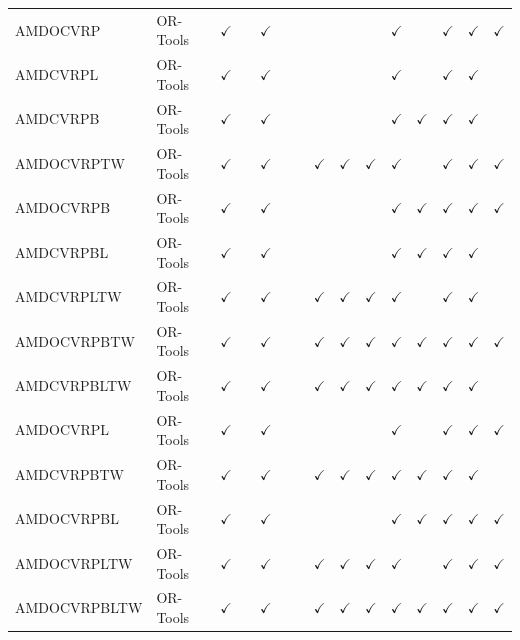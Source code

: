 \documentclass{article}
\theoremstyle{plain}
\theoremstyle{definition}
\theoremstyle{remark}
\begin{document}
\begin{table}[h!]
{\begin{tabular}{l|l|cc|cccccc|ccccc}
    AMDOCVRP&OR-Tools      & $\checkmark$ & & $\checkmark$ & & & & & & $\checkmark$ & & $\checkmark$ & $\checkmark$ & $\checkmark$ \\
    AMDCVRPL&OR-Tools      & $\checkmark$ & & $\checkmark$ & & & & & & $\checkmark$ & & $\checkmark$ & $\checkmark$ & \\
    AMDCVRPB&OR-Tools      & $\checkmark$ & & $\checkmark$ & & & & & & $\checkmark$ & $\checkmark$ & $\checkmark$ & $\checkmark$ & \\
    AMDOCVRPTW&OR-Tools    & $\checkmark$ & & $\checkmark$ & & & $\checkmark$ & $\checkmark$ & $\checkmark$ & $\checkmark$ & & $\checkmark$ & $\checkmark$ & $\checkmark$ \\
    AMDOCVRPB&OR-Tools     & $\checkmark$ & & $\checkmark$ & & & & & & $\checkmark$ & $\checkmark$ & $\checkmark$ & $\checkmark$ & $\checkmark$ \\
    AMDCVRPBL&OR-Tools     & $\checkmark$ & & $\checkmark$ & & & & & & $\checkmark$ & $\checkmark$ & $\checkmark$ & $\checkmark$ & \\
    AMDCVRPLTW &OR-Tools   & $\checkmark$ & & $\checkmark$ & & & $\checkmark$ & $\checkmark$ & $\checkmark$ & $\checkmark$ & & $\checkmark$ & $\checkmark$ & \\
    AMDOCVRPBTW&OR-Tools   & $\checkmark$ & & $\checkmark$ & & & $\checkmark$ & $\checkmark$ & $\checkmark$ & $\checkmark$ & $\checkmark$ & $\checkmark$ & $\checkmark$ & $\checkmark$ \\
    AMDCVRPBLTW&OR-Tools   & $\checkmark$ & & $\checkmark$ & & & $\checkmark$ & $\checkmark$ & $\checkmark$ & $\checkmark$ & $\checkmark$ & $\checkmark$ & $\checkmark$ & \\
    AMDOCVRPL&OR-Tools     & $\checkmark$ & & $\checkmark$ & & & & & & $\checkmark$ & & $\checkmark$ & $\checkmark$ & $\checkmark$ \\
    AMDCVRPBTW&OR-Tools    & $\checkmark$ & & $\checkmark$ & & & $\checkmark$ & $\checkmark$ & $\checkmark$ & $\checkmark$ & $\checkmark$ & $\checkmark$ & $\checkmark$ & \\
    AMDOCVRPBL&OR-Tools    & $\checkmark$ & & $\checkmark$ & & & & & & $\checkmark$ & $\checkmark$ & $\checkmark$ & $\checkmark$ & $\checkmark$ \\
    AMDOCVRPLTW&OR-Tools   & $\checkmark$ & & $\checkmark$ & & & $\checkmark$ & $\checkmark$ & $\checkmark$ & $\checkmark$ & & $\checkmark$ & $\checkmark$ & $\checkmark$ \\
    AMDOCVRPBLTW&OR-Tools  & $\checkmark$ & & $\checkmark$ & & & $\checkmark$ & $\checkmark$ & $\checkmark$ & $\checkmark$ & $\checkmark$ & $\checkmark$ & $\checkmark$ & $\checkmark$ \\

\end{tabular}}
\end{table}
\end{document}
